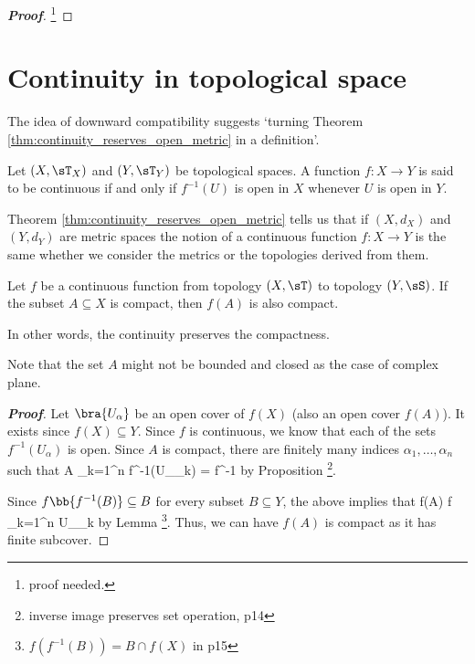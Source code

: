 \begin{proof}[\bf Proof]
\footnote{proof needed.}
\end{proof}

\section{Continuity in topological space}%

The idea of downward compatibility suggests `turning Theorem \ref{thm:continuity_reserves_open_metric} in a definition'.

\begin{definition}\label{def:continuous_topological_space}
Let $(X,\sT_X)$ and $(Y,\sT_Y)$ be topological spaces. A function $f:X\to Y$ is said to be continuous if and only if $f^{-1}(U)$ is open in $X$ whenever $U$ is open in $Y$.
\end{definition}

\begin{remark}
Theorem \ref{thm:continuity_reserves_open_metric} tells us that if $(X,d_X)$ and $(Y, d_Y)$ are metric spaces the notion of a continuous function $f:X \to Y$ is the same whether we consider the metrics or the topologies derived from them.
\end{remark}



\begin{theorem}
Let $f$ be a continuous function from topology $(X,\sT)$ to topology $(Y,\sS)$. If the subset $A\subseteq X$ is compact, then $f(A)$ is also compact.

In other words, the continuity preserves the compactness.
\end{theorem}

\begin{remark}
Note that the set $A$ might not be bounded and closed as the case of complex plane.
\end{remark}

\begin{proof}[\bf Proof]
Let $\bra{U_\alpha}$ be an open cover of $f(X)$ (also an open cover $f(A)$). It exists since $f(X) \subseteq Y$. Since $f$ is continuous, we know that each of the sets $f^{-1}(U_\alpha)$ is open. Since $A$ is compact, there are finitely many indices $\alpha_1,\dots,\alpha_n$ such that
\be
A \subseteq \bigcup_{k=1}^n f^{-1}(U_{\alpha_k}) = f^{-1}
\ee
by Proposition \footnote{inverse image preserves set operation, p14}.

Since $f\bb{f^{-1}(B)} \subseteq B$ for every subset $B \subseteq Y$, the above implies that
\be
f(A) \subseteq f \subseteq \bigcup_{k=1}^n U_{\alpha_k}
\ee
by Lemma \footnote{$f(f^{-1}(B)) = B\cap f(X)$ in p15}. Thus, we can have $f(A)$ is compact as it has finite subcover.
\end{proof}



